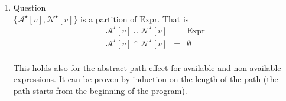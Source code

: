\documentclass[a4paper]{article}
\def\la{\leftarrow}
\begin{document}
\begin{enumerate}
  \item Question \\

  $ \{ \mathcal{A}^\star[v], \mathcal{N}^\star[v] \} $ is a partition of $
  \mathrm{Expr} $. That is
  \begin{eqnarray*}
    \mathcal{A}^\star[v] \cup \mathcal{N}^\star[v] &=& \mathrm{Expr} \\
    \mathcal{A}^\star[v] \cap \mathcal{N}^\star[v] &=& \emptyset \\
  \end{eqnarray*}

  This holds also for the abstract path effect for available and non available
  expressions. It can be proven by induction on the length of the path (the
  path starts from the beginning of the program).
    

\end{enumerate}


% 
% 
% 
% 
% 


\end{document}
